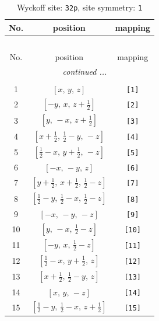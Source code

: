\documentclass[fleqn,8pt]{jsarticle}
\begin{document}
\renewcommand{\arraystretch}{1.2}
\begin{longtable}{ccc}
\caption{Wyckoff site: {\tt 32p}, site symmetry: {\tt 1}}
 \\
 \hline \hline
No. & position & mapping \\ \hline \endfirsthead

\multicolumn{2}{l}{\tablename\ \thetable{}} \\
 \hline \hline
No. & position & mapping \\ \hline \endhead

 \hline \hline
\multicolumn{2}{r}{\footnotesize\it continued ...} \\ \endfoot

 \hline \hline
\multicolumn{2}{r}{} \\ \endlastfoot

1 & $\left[ x,\, y,\, z \right]$ & {\tt [1]} \\ \hline
2 & $\left[ - y,\, x,\, z + \frac{1}{2} \right]$ & {\tt [2]} \\ \hline
3 & $\left[ y,\, - x,\, z + \frac{1}{2} \right]$ & {\tt [3]} \\ \hline
4 & $\left[ x + \frac{1}{2},\, \frac{1}{2} - y,\, - z \right]$ & {\tt [4]} \\ \hline
5 & $\left[ \frac{1}{2} - x,\, y + \frac{1}{2},\, - z \right]$ & {\tt [5]} \\ \hline
6 & $\left[ - x,\, - y,\, z \right]$ & {\tt [6]} \\ \hline
7 & $\left[ y + \frac{1}{2},\, x + \frac{1}{2},\, \frac{1}{2} - z \right]$ & {\tt [7]} \\ \hline
8 & $\left[ \frac{1}{2} - y,\, \frac{1}{2} - x,\, \frac{1}{2} - z \right]$ & {\tt [8]} \\ \hline
9 & $\left[ - x,\, - y,\, - z \right]$ & {\tt [9]} \\ \hline
10 & $\left[ y,\, - x,\, \frac{1}{2} - z \right]$ & {\tt [10]} \\ \hline
11 & $\left[ - y,\, x,\, \frac{1}{2} - z \right]$ & {\tt [11]} \\ \hline
12 & $\left[ \frac{1}{2} - x,\, y + \frac{1}{2},\, z \right]$ & {\tt [12]} \\ \hline
13 & $\left[ x + \frac{1}{2},\, \frac{1}{2} - y,\, z \right]$ & {\tt [13]} \\ \hline
14 & $\left[ x,\, y,\, - z \right]$ & {\tt [14]} \\ \hline
15 & $\left[ \frac{1}{2} - y,\, \frac{1}{2} - x,\, z + \frac{1}{2} \right]$ & {\tt [15]} \\ \hline

\end{longtable}
\end{document}
